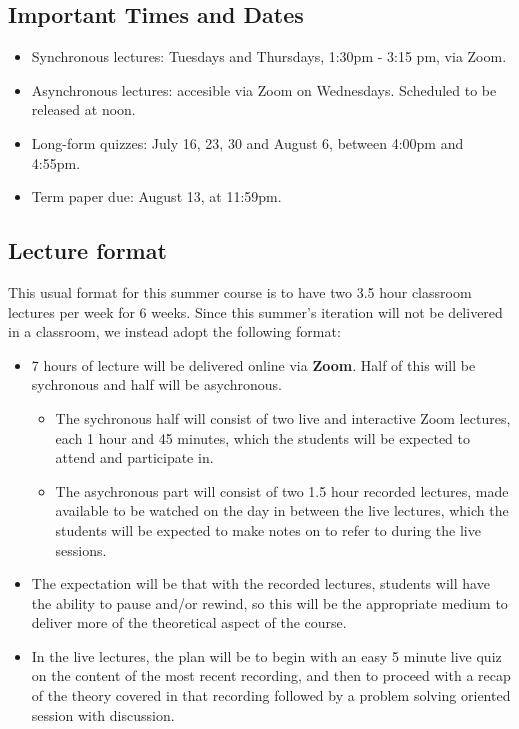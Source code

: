 \documentclass[11pt]{amsart}
\numberwithin{equation}{section}
\begin{document}
\subsection{Important Times and Dates}
\begin{itemize}
\item Synchronous lectures: Tuesdays and Thursdays, 1:30pm - 3:15 pm, via Zoom.
\item Asynchronous lectures: accesible via Zoom on Wednesdays. Scheduled to be released at noon.
\item Long-form quizzes: July 16, 23, 30 and August 6, between 4:00pm and 4:55pm. 
\item Term paper due: August 13, at 11:59pm.
\end{itemize}

\subsection{Lecture format}
\noindent This usual format for this summer course is to have two 3.5 hour classroom lectures per week for 6 weeks. Since this summer's iteration will not be delivered in a classroom, we instead adopt the following format:
\begin{itemize}
\item 7 hours of lecture will be delivered online via \textbf{Zoom}. Half of this will be sychronous and half will be asychronous.
\begin{itemize}
\item The sychronous half will consist of two live and interactive Zoom lectures, each 1 hour and 45 minutes, which the students will be expected to attend and participate in.
\item The asychronous part will consist of two 1.5 hour recorded lectures, made available to be watched on the day in between the live lectures, which the students will be expected to make notes on to refer to during the live sessions.
\end{itemize}
\item The expectation will be that with the recorded lectures, students will have the ability to pause and/or rewind, so this will be the appropriate medium to deliver more of the theoretical aspect of the course.
\item In the live lectures, the plan will be to begin with an easy 5 minute live quiz on the content of the most recent recording, and then to proceed with a recap of the theory covered in that recording followed by a problem solving oriented session with discussion.
\end{itemize}
\end{document}
